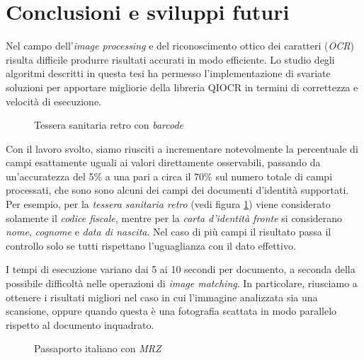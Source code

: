 \chapter*{Conclusioni e sviluppi futuri}

Nel campo dell'\textit{image processing} e del riconoscimento ottico dei caratteri (\textit{OCR}) risulta difficile produrre risultati accurati in modo efficiente. Lo studio degli algoritmi descritti in questa tesi ha permesso l'implementazione di svariate soluzioni per apportare migliorie della libreria QIOCR in termini di correttezza e velocit\`a di esecuzione.\par
\begin{figure}
	\centering
	\caption{Tessera sanitaria retro con \textit{barcode}} \label{fig:ts-r-example}
\end{figure}
Con il lavoro svolto, siamo riusciti a incrementare notevolmente la percentuale di campi esattamente uguali ai valori direttamente osservabili, passando da un'accuratezza del 5\% a una pari a circa il 70\% sul numero totale di campi processati, che sono sono alcuni dei campi dei documenti d'identit\`a supportati. 
Per esempio, per la \textit{tessera sanitaria retro} (vedi figura \ref{fig:ts-r-example}) viene considerato solamente il \textit{codice fiscale}, mentre per la \textit{carta d'identit\`a fronte} si considerano \textit{nome}, \textit{cognome} e \textit{data di nascita}. Nel caso di pi\`u campi il risultato passa il controllo solo se tutti rispettano l'uguaglianza con il dato effettivo.\par 
I tempi di esecuzione variano dai 5 ai 10 secondi per documento, a seconda della possibile difficolt\`a nelle operazioni di \textit{image matching}. In particolare, riusciamo a ottenere i risultati migliori nel caso in cui l'immagine analizzata sia una scansione, oppure quando questa \`e una fotografia scattata in modo parallelo rispetto al documento inquadrato.\par
\begin{figure}
	\centering
	\caption[Passaporto italiano con \textit{MRZ}]{Passaporto italiano con \textit{MRZ}\protect\footnotemark} \label{fig:passport}
\end{figure}
